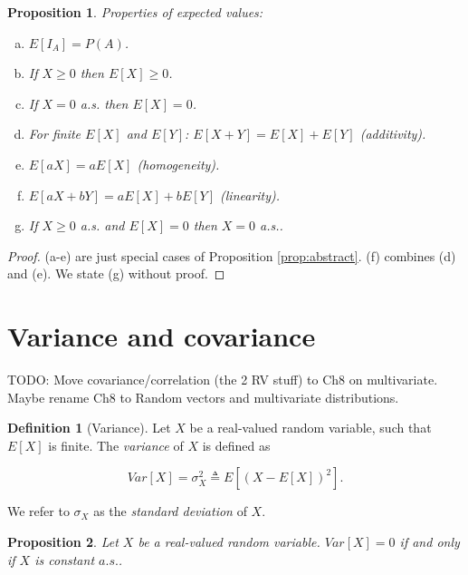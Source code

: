 \documentclass{book}
\theoremstyle{plain}%
\newtheorem{proposition}{Proposition}[section]
\theoremstyle{definition}
\newtheorem{definition}{Definition}[section]
\begin{document}
\begin{proposition}

Properties of expected values:

\begin{enumerate}[(a)]
\item $E[I_A] = P(A)$.
\item If $X \geq 0$ then $E[X] \geq 0$.
\item If $X = 0$ a.s. then $E[X] = 0$.
\item For finite $E[X]$ and $E[Y]$: $E[X+Y] = E[X] + E[Y]$ \emph{(additivity)}.
\item $E[aX] = aE[X]$ \emph{(homogeneity)}.
\item $E[aX + bY] = aE[X] + bE[Y]$ \emph{(linearity)}.
\item If $X \geq 0$ a.s. and $E[X] = 0$ then $X = 0$ a.s..
\end{enumerate}\label{prop:properties_of_expectation}
\end{proposition}

\begin{proof}
(a-e) are just special cases of Proposition \ref{prop:abstract}. (f) combines (d) and (e). We state (g) without proof.
\end{proof}


\section{Variance and covariance}

TODO: Move covariance/correlation (the 2 RV stuff) to Ch8 on multivariate. Maybe rename Ch8 to Random vectors and multivariate distributions.

\begin{definition}[Variance] Let $X$ be a real-valued random variable, such that $E[X]$ is finite.  The \emph{variance} of $X$ is defined as

$$Var[X] = \sigma^2_{X} \triangleq E[(X - E[X])^2].$$

We refer to $\sigma_X$ as the\emph{ standard deviation} of $X$.
\end{definition}

\begin{proposition}
Let $X$ be a real-valued random variable. $Var[X] = 0$ if and only if $X$ is constant $a.s.$.
\end{proposition}
\end{document}
